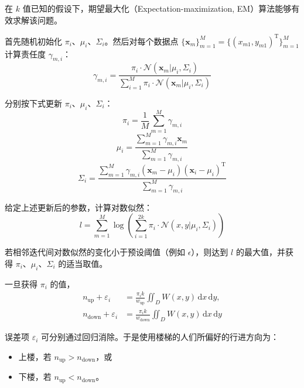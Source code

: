\documentclass[11pt,a4paper]{ctexart}
\newcommand{\cfgup}{\mathrm{up}}
\newcommand{\cfgdown}{\mathrm{down}}
\begin{document}
在 $k$ 值已知的假设下，期望最大化（Expectation-maximization, EM）算法能够有效求解该问题。

首先随机初始化 $\pi_i$、$\mu_i$、$\Sigma_i$。然后对每个数据点 $\{\mathbf{x}_m\}_{m=1}^{M} = \{(x_{m1},y_{m1})^{\mathrm{T}}\}_{m=1}^{M}$ 计算责任度 $\gamma_{m,i}$：
\begin{equation}
\gamma_{m,i} = \frac{\pi_i\cdot\mathcal{N}(\mathbf{x}_m|\mu_i,\Sigma_i)}{\sum_{i=1}^{M}\pi_i\cdot\mathcal{N}(\mathbf{x}_m|\mu_i,\Sigma_i)}
\end{equation}

分别按下式更新 $\pi_i$、$\mu_i$、$\Sigma_i$：
\begin{equation}
\pi_i = \frac{1}{M}\sum_{m=1}^{M}\gamma_{m,i}
\end{equation}
\begin{equation}
\mu_i = \frac{\sum_{m=1}^{M}\gamma_{m,i}\mathbf{x}_m}{\sum_{m=1}^{M}\gamma_{m,i}}
\end{equation}
\begin{equation}
\Sigma_i = \frac{\sum_{m=1}^{M}\gamma_{m,i}(\mathbf{x}_m-\mu_i)(\mathbf{x}_i-\mu_i)^{\mathrm{T}}}{\sum_{m=1}^{M}\gamma_{m,i}}
\end{equation}

给定上述更新后的参数，计算对数似然：
\begin{equation}
l = \sum_{m=1}^{M}\log\left(\sum_{i=1}^{2k}\pi_i\cdot\mathcal{N}(x,y|\mu_i,\Sigma_i)\right)
\end{equation}

若相邻迭代间对数似然的变化小于预设阈值（例如 $\epsilon$），则达到 $l$ 的最大值，并获得 $\pi_i$、$\mu_i$、$\Sigma_i$ 的适当取值。

一旦获得 $\pi_i$ 的值，
\begin{equation}
\begin{aligned}
n_{\cfgup}+\varepsilon_i &= \frac{\pi_i k}{w_{\cfgup}}\iint_{D} W(x,y)\,\mathrm{d}x\,\mathrm{d}y,\\
n_{\cfgdown}+\varepsilon_i &= \frac{\pi_i k}{w_{\cfgdown}}\iint_{D} W(x,y)\,\mathrm{d}x\,\mathrm{d}y
\end{aligned}
\end{equation}

误差项 $\varepsilon_i$ 可分别通过回归消除。于是使用楼梯的人们所偏好的行进方向为：

\begin{itemize}
\item 上楼，若 $n_{\cfgup} > n_{\cfgdown}$，或
\item 下楼，若 $n_{\cfgup} < n_{\cfgdown}$。
\end{itemize}
\end{document}
